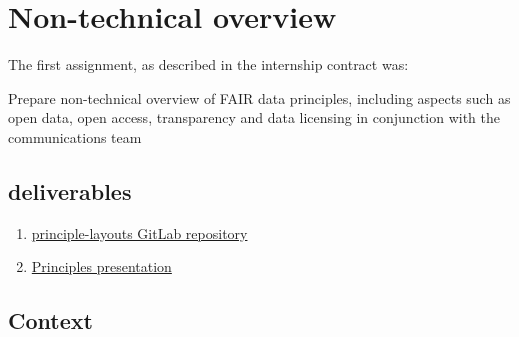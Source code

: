 \documentclass[journal, dvipsnames]{IEEEtran}
\begin{document}
\section{Non-technical overview}\label{sec_principleLayouts}

The first assignment, as described in the internship contract was: 

\begin{displayquote}
Prepare non-technical overview of FAIR data principles, including aspects such as open data, open access, transparency and data licensing in conjunction with the communications team
\end{displayquote}

\subsection{deliverables}

\begin{enumerate}
  \item \href{https://gitlab.opengeohub.org/fee.gevaert/principle-layouts}{principle-layouts GitLab repository}
  \item \href{https://docs.google.com/presentation/d/1WbRK-zqMdRuJhKWRRTlUAHmJRbBy5EcEQT-SACt75lE/edit?usp=sharing}{Principles presentation}
\end{enumerate}

\subsection{Context}
\end{document}
